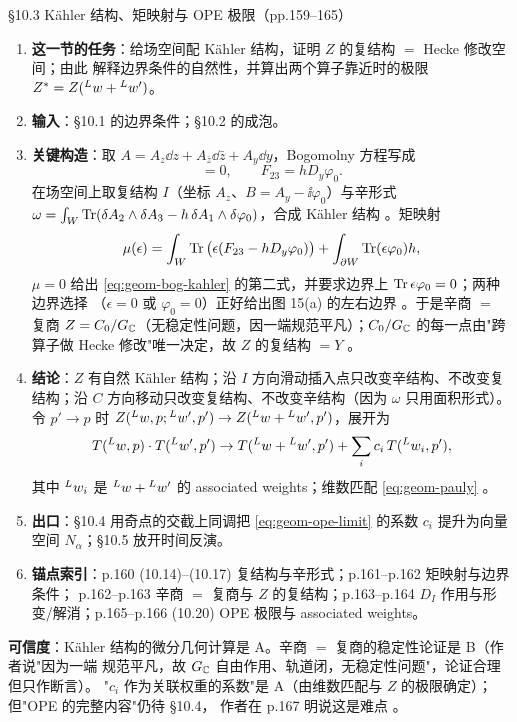 \begin{kcard}{\S10.3 Kähler 结构、矩映射与 OPE 极限（pp.159--165）}
\begin{enumerate}[label=\textbf{\arabic*}]
\item \textbf{这一节的任务}：给场空间配 Kähler 结构，证明 $Z$ 的复结构 $=$ Hecke 修改空间；由此
  解释边界条件的自然性，并算出两个算子靠近时的极限 $Z^*=Z({}^{L}w+{}^{L}w')$。
\item \textbf{输入}：\S10.1 的边界条件；\S10.2 的成泡。
\item \textbf{关键构造}：取 $A=A_z\dd z+A_{\bar z}\dd\bar z+A_y\dd y$，Bogomolny 方程写成
\begin{equation}
[D_y-\ii\varphi_0,D_z]=0,\qquad F_{23}=hD_y\varphi_0 .
\label{eq:geom-bog-kahler}
\end{equation}
  在场空间上取复结构 $I$（坐标 $A_z$、$B=A_y-\ii\varphi_0$）与辛形式
  $\omega=\int_W\operatorname{Tr}(\delta A_2\wedge\delta A_3-h\,\delta A_1\wedge\delta\varphi_0)$，合成 Kähler
  结构 \pA{}。矩映射
\begin{equation}
\mu(\epsilon)=\int_W\operatorname{Tr}\big(\epsilon(F_{23}-hD_y\varphi_0)\big)+\int_{\partial W}\operatorname{Tr}(\epsilon\varphi_0)h ,
\label{eq:geom-moment}
\end{equation}
  $\mu=0$ 给出 \eqref{eq:geom-bog-kahler} 的第二式，并要求边界上 $\operatorname{Tr}\epsilon\varphi_0=0$；两种边界选择
  （$\epsilon=0$ 或 $\varphi_0=0$）正好给出图 15(a) 的左右边界 \pA{}。于是辛商
  $=$ 复商 $Z=C_0/G_{\mathbb{C}}$（无稳定性问题，因一端规范平凡）；$C_0/G_{\mathbb{C}}$ 的每一点由"跨算子做 Hecke
  修改"唯一决定，故 $Z$ 的复结构 $=Y$ \pA{}。
\item \textbf{结论}：$Z$ 有自然 Kähler 结构；沿 $I$ 方向滑动插入点只改变辛结构、不改变复结构；沿
  $C$ 方向移动只改变复结构、不改变辛结构（因为 $\omega$ 只用面积形式）。令 $p'\to p$ 时
  $Z({}^{L}w,p;{}^{L}w',p')\to Z({}^{L}w+{}^{L}w',p')$，展开为
\begin{equation}
T({}^{L}w,p)\cdot T({}^{L}w',p')\to T({}^{L}w+{}^{L}w',p')
+\sum_i c_i\,T({}^{L}w_i,p'),
\label{eq:geom-ope-limit}
\end{equation}
  其中 ${}^{L}w_i$ 是 ${}^{L}w+{}^{L}w'$ 的 associated weights；维数匹配 \eqref{eq:geom-pauly}
  \pA{}。
\item \textbf{出口}：\S10.4 用奇点的交截上同调把 \eqref{eq:geom-ope-limit} 的系数 $c_i$ 提升为向量空间
  $N_\alpha$；\S10.5 放开时间反演。
\item \textbf{锚点索引}：p.160 (10.14)--(10.17) 复结构与辛形式；p.161--p.162 矩映射与边界条件；
  p.162--p.163 辛商 $=$ 复商与 $Z$ 的复结构；p.163--p.164 $D_I$ 作用与形变/解消；p.165--p.166
  (10.20) OPE 极限与 associated weights。
\end{enumerate}
\textbf{可信度}：Kähler 结构的微分几何计算是 A。辛商 $=$ 复商的稳定性论证是 B（作者说"因为一端
规范平凡，故 $G_{\mathbb{C}}$ 自由作用、轨道闭，无稳定性问题"，论证合理但只作断言）\pB{}。
"$c_i$ 作为关联权重的系数"是 A（由维数匹配与 $Z$ 的极限确定）；但"OPE 的完整内容"仍待 \S10.4，
作者在 p.167 明说这是难点 \pA{}。
\end{kcard}

